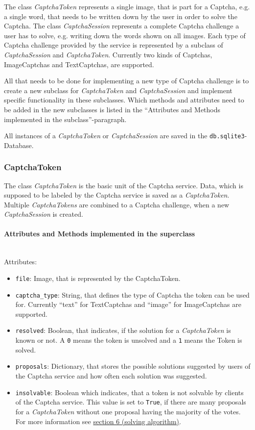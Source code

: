 The class \emph{CaptchaToken} represents a single image, that is part for a Captcha, e.g. a single word, that needs to be written down by the user in order to solve the Captcha. The class \emph{CaptchaSession} represents a complete Captcha challenge a user has to solve, e.g. writing down the words shown on all images. Each type of Captcha challenge provided by the service is represented by a subclass of \emph{CaptchaSession} and \emph{CaptchaToken}. Currently two kinds of Captchas, ImageCaptchas and TextCaptchas, are supported. 


All that needs to be done for implementing a new type of Captcha challenge is to create a new subclass for \emph{CaptchaToken} and \emph{CaptchaSession} and implement specific functionality in these subclasses. Which methods and attributes need to be added in the new subclasses is listed in the ``Attributes and Methods implemented in the subclass''-paragraph.

All instances of a \emph{CaptchaToken} or \emph{CaptchaSession} are saved in the \verb|db.sqlite3|-Database. 

\clearpage
\subsubsection{CaptchaToken}

The class \emph{CaptchaToken} is the basic unit of the Captcha service. Data, which is supposed to be labeled by the Captcha service is saved as a \emph{CaptchaToken}. Multiple \emph{CaptchaTokens} are combined to a Captcha challenge, when a new \emph{CaptchaSession} is created.

\paragraph{Attributes and Methods implemented in the superclass} \mbox{} \\
Attributes:

\begin{itemize}
\item \verb|file|: Image, that is represented by the CaptchaToken.
\item \verb|captcha_type|: String, that defines the type of Captcha the token can be used for. Currently ``text'' for TextCaptchas and ``image'' for ImageCaptchas are supported.
\item \verb|resolved|: Boolean, that indicates, if the solution for a \emph{CaptchaToken} is known or not. A \verb|0| means the token is unsolved and a \verb|1| means the Token is solved.
\item \verb|proposals|: Dictionary, that stores the possible solutions suggested by users of the Captcha service and how often each solution was suggested.
\item \verb|insolvable|: Boolean which indicates, that a token is not solvable by clients of the Captcha service. This value is set to \verb|True|, if there are many proposals for a \emph{CaptchaToken} without one proposal having the majority of the votes. For more information see \hyperref[sec:solving_algorithm]{section 6 (solving algorithm)}.
\end{itemize}

